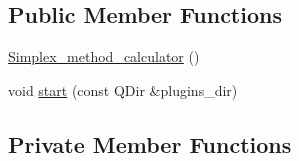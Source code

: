 \subsection*{Public Member Functions}
\begin{DoxyCompactItemize}
\item 
\hyperlink{classSimplex__method__calculator_acf752aa35f11c00914e09e66818e178c}{Simplex\+\_\+method\+\_\+calculator} ()
\item 
void \hyperlink{classSimplex__method__calculator_acad83ff8660c546cad0f097a500a21fb}{start} (const Q\+Dir \&plugins\+\_\+dir)
\end{DoxyCompactItemize}
\subsection*{Private Member Functions}
